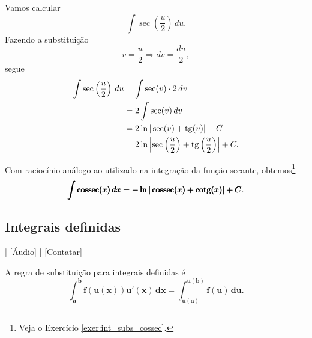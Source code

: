 \begin{ex}
  Vamos calcular
  \begin{equation}
    \int\sec\left(\frac{u}{2}\right)\,du.
  \end{equation}
  Fazendo a substituição
  \begin{equation}
    v = \frac{u}{2} \Rightarrow dv = \frac{du}{2},
  \end{equation}
  segue
  \begin{align}
    \int\sec\left(\frac{u}{2}\right)\,du &= \int\sec(v)\cdot 2\,dv \\
                                         &= 2\int \sec(v)\,dv \\
                                         &= 2\ln|\sec(v)+\operatorname{tg}(v)| + C \\
                                         &= 2\ln\left|\sec\left(\frac{u}{2}\right)+\operatorname{tg}\left(\frac{u}{2}\right)\right| + C.
  \end{align}
\end{ex}

Com raciocínio análogo ao utilizado na integração da função secante, obtemos\footnote{Veja o Exercício \ref{exer:int_subs_cossec}.}
\begin{equation}
  \pmb{\int \operatorname{cossec}(x)\,dx = -\ln|\operatorname{cossec}(x)+\operatorname{cotg}(x)| + C}.
\end{equation}


\subsection{Integrais definidas}

\begin{flushright}
  [Vídeo] | [Áudio] | \href{https://phkonzen.github.io/notas/contato.html}{[Contatar]}
\end{flushright}

A regra de substituição para integrais definidas é
\begin{equation}
  \pmb{\int_a^b f(u(x))u'(x)\,dx = \int_{u(a)}^{u(b)} f(u)\,du}.
\end{equation}

